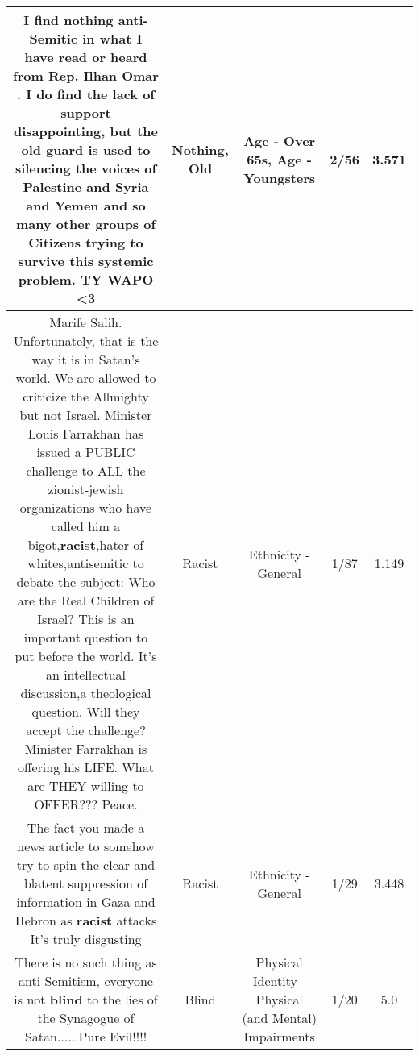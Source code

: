 \documentclass[11pt]{article}
\newlength\mylength
\begin{document}
\begin{center}
\begin{longtable}{|C{.65\mylength}|C{.30\mylength}|C{.12\mylength}|C{.12\mylength}|C{.12\mylength}|}
  \small I find \textbf{nothing} anti-Semitic in what I have read or heard from Rep. Ilhan Omar . I do find the lack of support disappointing, but the \textbf{old} guard is used to silencing the voices of Palestine and Syria and Yemen and so many other groups of Citizens trying to survive this systemic problem. TY WAPO <3\normalsize   & Nothing, Old & Age - Over 65s, Age - Youngsters & 2/56 & 3.571 \\  \hline
  \small Marife Salih. Unfortunately, that is the way it is in Satan's world. We are allowed to criticize the Allmighty but not Israel. Minister Louis Farrakhan has issued a PUBLIC challenge to ALL the zionist-jewish organizations who have called him a bigot,\textbf{racist},hater of whites,antisemitic to debate the subject: Who are the Real Children of Israel? This is an important question to put before the world. It's an intellectual discussion,a theological question. Will they accept the challenge?Minister Farrakhan is offering his LIFE. What are THEY willing to OFFER??? Peace.\normalsize   & Racist & Ethnicity - General & 1/87 & 1.149 \\  \hline
  \small The fact you made a news article to somehow try to spin the clear and blatent suppression of information in Gaza and Hebron as \textbf{racist} attacks It's truly disgusting\normalsize   & Racist & Ethnicity - General & 1/29 & 3.448 \\  \hline
  \small There is no such thing as anti-Semitism, everyone is not \textbf{blind} to the lies of the Synagogue of Satan......Pure Evil!!!!\normalsize   & Blind & Physical Identity - Physical (and Mental) Impairments & 1/20 & 5.0 \\  \hline

\end{longtable}
\end{center}
\end{document}

